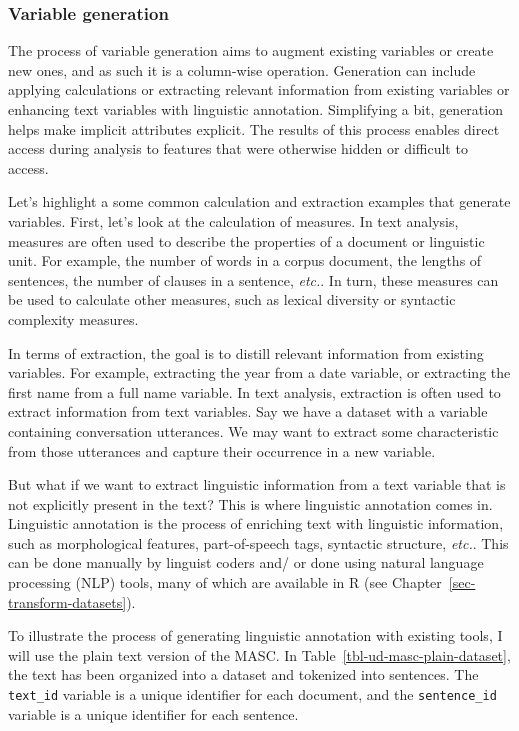 \documentclass[
  letterpaper,
  DIV=11,
  numbers=noendperiod]{scrreport}
\theoremstyle{definition}
\theoremstyle{remark}
\begin{document}
\hypertarget{sec-ud-variable-generation}{%
\subsubsection{Variable generation}\label{sec-ud-variable-generation}}

The process of variable generation aims to augment existing variables or
create new ones, and as such it is a column-wise operation. Generation
can include applying calculations or extracting relevant information
from existing variables or enhancing text variables with linguistic
annotation. Simplifying a bit, generation helps make implicit attributes
explicit. The results of this process enables direct access during
analysis to features that were otherwise hidden or difficult to access.

Let's highlight a some common calculation and extraction examples that
generate variables. First, let's look at the calculation of measures. In
text analysis, measures are often used to describe the properties of a
document or linguistic unit. For example, the number of words in a
corpus document, the lengths of sentences, the number of clauses in a
sentence, \emph{etc.}. In turn, these measures can be used to calculate
other measures, such as lexical diversity or syntactic complexity
measures.

In terms of extraction, the goal is to distill relevant information from
existing variables. For example, extracting the year from a date
variable, or extracting the first name from a full name variable. In
text analysis, extraction is often used to extract information from text
variables. Say we have a dataset with a variable containing conversation
utterances. We may want to extract some characteristic from those
utterances and capture their occurrence in a new variable.

But what if we want to extract linguistic information from a text
variable that is not explicitly present in the text? This is where
linguistic annotation comes in. Linguistic annotation is the process of
enriching text with linguistic information, such as morphological
features, part-of-speech tags, syntactic structure, \emph{etc.}. This
can be done manually by linguist coders and/ or done using natural
language processing (NLP) tools, many of which are available in R (see
Chapter~\ref{sec-transform-datasets}).

To illustrate the process of generating linguistic annotation with
existing tools, I will use the plain text version of the MASC. In
Table~\ref{tbl-ud-masc-plain-dataset}, the text has been organized into
a dataset and tokenized into sentences. The \texttt{text\_id} variable
is a unique identifier for each document, and the \texttt{sentence\_id}
variable is a unique identifier for each sentence.
\end{document}
